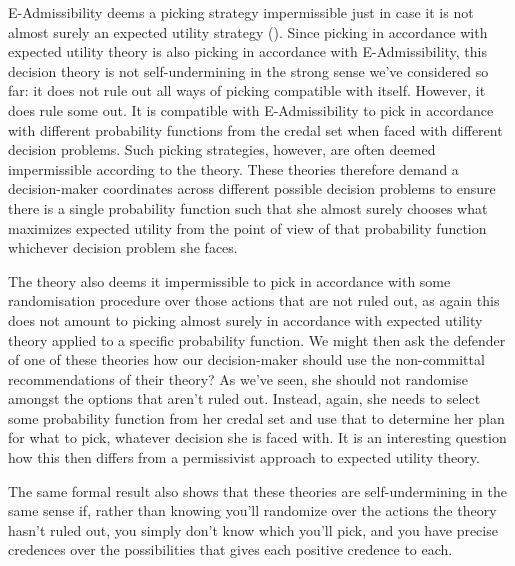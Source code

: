 \documentclass[a4paper,final]{article}
\newenvironment{CCM rewritten}
{\begingroup\color{blue}} %
{\endgroup}              %
\begin{document}
	E-Admissibility deems a picking strategy impermissible just in case it is not almost surely an expected utility strategy (). Since picking in accordance with expected utility theory is also picking in accordance with E-Admissibility, this decision theory is not self-undermining in the strong sense we've considered so far: it does not rule out all ways of picking compatible with itself. However, it does rule some out.
	 It is compatible with E-Admissibility to pick in accordance with different probability functions from the credal set when faced with different decision problems. 
	 Such picking strategies, however, are often deemed impermissible according to the theory.
	 These theories therefore demand a decision-maker coordinates across different possible decision problems to ensure there is a single probability function such that she almost surely chooses what maximizes expected utility from the point of view of that probability function whichever decision problem she faces.
	 
	 The theory also deems it impermissible to pick in accordance with some randomisation procedure over those actions that are not ruled out,
	 as again this does not amount to picking almost surely in accordance with expected utility theory applied to a specific probability function. 
	 We might then ask the defender of one of these theories how our decision-maker should use the non-committal recommendations of their theory? As we've seen, she should not randomise amongst the options that aren't ruled out. Instead, again, she needs to select some probability function from her credal set and use that to determine her plan for what to pick, whatever decision she is faced with. 
	 It is an interesting question how this then differs from a permissivist approach to expected utility theory. 
	 
	 The same formal result also shows that these theories are self-undermining in the same sense if, rather than knowing you'll randomize over the actions the theory hasn't ruled out, you simply don't know which you'll pick, and you have precise credences over the possibilities that gives each positive credence to each.%
	 
\end{document}
